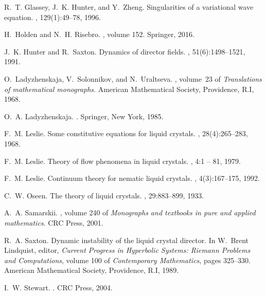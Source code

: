 \documentclass[11pt,leqno]{amsart}
\begin{document}
\begin{thebibliography}{10}
R.~T. Glassey, J.~K. Hunter, and Y.~Zheng.
\newblock Singularities of a variational wave equation.
, 129(1):49--78, 1996.

H.~Holden and N.~H. Risebro.
, volume 152.
\newblock Springer, 2016.

J.~K. Hunter and R.~Saxton.
\newblock Dynamics of director fields.
, 51(6):1498--1521, 1991.

O.~Ladyzhenskaja, V.~Solonnikov, and N.~Uraltseva.
, volume~23
  of {\em Translations of mathematical monographs}.
\newblock American Mathematical Society, Providence, R.I, 1968.

O.~A. Ladyzhenskaja.
.
\newblock Springer, New York, 1985.

F.~M. Leslie.
\newblock Some constitutive equations for liquid crystals.
, 28(4):265--283,
  1968.

F.~M. Leslie.
\newblock Theory of flow phenomena in liquid crystals.
, 4:1 -- 81, 1979.

F.~M. Leslie.
\newblock Continuum theory for nematic liquid crystals.
, 4(3):167--175, 1992.

C.~W. Oseen.
\newblock The theory of liquid crystals.
, 29:883--899, 1933.

A.~A. Samarskii.
, volume 240 of {\em Monographs
  and textbooks in pure and applied mathematics}.
\newblock CRC Press, 2001.

R.~A. Saxton.
\newblock Dynamic instability of the liquid crystal director.
\newblock In W.~Brent Lindquist, editor, {\em Current Progress in Hyperbolic
  Systems: Riemann Problems and Computations}, volume 100 of {\em Contemporary
  Mathematics}, pages 325--330. American Mathematical Society, Providence, R.I,
  1989.

I.~W. Stewart.
.
\newblock CRC Press, 2004.


\end{thebibliography}
\end{document}
